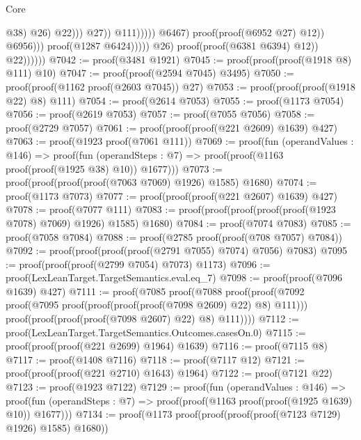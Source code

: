 \begin{lexlean}{Core}
\begin{coremodule}
                                                                                  @38)
                                                                                @26)
                                                                              @22)))
                                                                    @27))
                                                              @111)))))
                                              @6467)
                                            proof(proof(@6952 @27) @12))
                                          @6956)))
                                  proof(@1287 @6424)))))
                      @26)
                    proof(proof(@6381 @6394) @12))
                  @22))))))
@7042 := proof(@3481 @1921)
@7045 := proof(proof(proof(@1918 @8) @111) @10)
@7047 := proof(proof(@2594 @7045) @3495)
@7050 := proof(proof(@1162 proof(@2603 @7045)) @27)
@7053 := proof(proof(proof(@1918 @22) @8) @111)
@7054 := proof(@2614 @7053)
@7055 := proof(@1173 @7054)
@7056 := proof(@2619 @7053)
@7057 := proof(@7055 @7056)
@7058 := proof(@2729 @7057)
@7061 := proof(proof(proof(@221 @2609) @1639) @427)
@7063 := proof(@1923 proof(@7061 @111))
@7069 := proof(fun (operandValues : @146) =>
    proof(fun (operandSteps : @7) => proof(proof(@1163 proof(proof(@1925 @38) @10)) @1677)))
@7073 := proof(proof(proof(proof(@7063 @7069) @1926) @1585) @1680)
@7074 := proof(@1173 @7073)
@7077 := proof(proof(proof(@221 @2607) @1639) @427)
@7078 := proof(@7077 @111)
@7083 := proof(proof(proof(proof(proof(@1923 @7078) @7069) @1926) @1585) @1680)
@7084 := proof(@7074 @7083)
@7085 := proof(@7058 @7084)
@7088 := proof(@2785 proof(proof(@708 @7057) @7084))
@7092 := proof(proof(proof(proof(@2791 @7055) @7074) @7056) @7083)
@7095 := proof(proof(proof(@2799 @7054) @7073) @1173)
@7096 := proof(LexLeanTarget.TargetSemantics.eval.eq_7)
@7098 := proof(proof(@7096 @1639) @427)
@7111 := proof(@7085
      proof(@7088
          proof(proof(@7092 proof(@7095 proof(proof(proof(proof(@7098 @2609) @22) @8) @111)))
              proof(proof(proof(proof(@7098 @2607) @22) @8) @111))))
@7112 := proof(LexLeanTarget.TargetSemantics.Outcomes.casesOn.{0})
@7115 := proof(proof(proof(@221 @2699) @1964) @1639)
@7116 := proof(@7115 @8)
@7117 := proof(@1408 @7116)
@7118 := proof(@7117 @12)
@7121 := proof(proof(proof(@221 @2710) @1643) @1964)
@7122 := proof(@7121 @22)
@7123 := proof(@1923 @7122)
@7129 := proof(fun (operandValues : @146) =>
    proof(fun (operandSteps : @7) => proof(proof(@1163 proof(proof(@1925 @1639) @10)) @1677)))
@7134 := proof(@1173 proof(proof(proof(proof(@7123 @7129) @1926) @1585) @1680))

\end{coremodule}
\end{lexlean}
